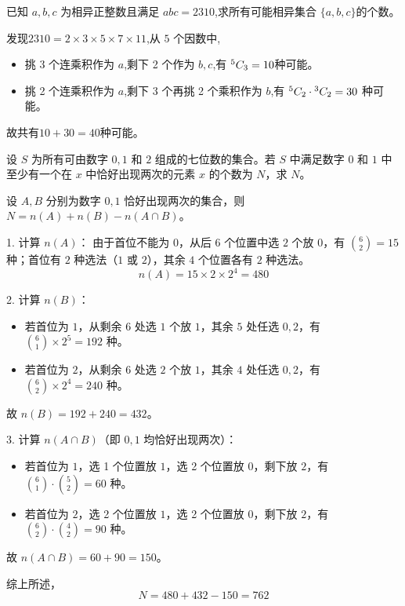 \begin{questions}
    \question 已知 $a,b,c$ 为相异正整数且满足 $abc=2310$,求所有可能相异集合 $\{a,b,c\}$的个数。
    \begin{solution}
        发现$2310 = 2\times 3\times 5\times 7\times 11$,从 $5$ 个因数中,
        \begin{itemize}
            \item 挑 3 个连乘积作为 $a$,剩下 2 个作为 $b,c$,有
            ${}^{5}C_{3} = 10$种可能。
            \item 挑 2 个连乘积作为 $a$,剩下 3 个再挑 2 个乘积作为 $b$,有 ${}^{5}C_{2} \cdot {}^{3}C_{2} = 30$
            种可能。
        \end{itemize}
        故共有$10 + 30 = 40$种可能。
    \end{solution}

\question 设 $S$ 为所有可由数字 $0, 1$ 和 $2$ 组成的七位数的集合。若 $S$ 中满足数字 $0$ 和 $1$ 中至少有一个在 $x$ 中恰好出现两次的元素 $x$ 的个数为 $N$，求 $N$。
\begin{solution}
    设 $A, B$ 分别为数字 $0, 1$ 恰好出现两次的集合，则 $N = n(A) + n(B) - n(A \cap B)$。

    1. 计算 $n(A)$：
    由于首位不能为 $0$，从后 $6$ 个位置中选 $2$ 个放 $0$，有 $\binom{6}{2}=15$ 种；首位有 $2$ 种选法（$1$ 或 $2$），其余 $4$ 个位置各有 $2$ 种选法。
    \[ n(A) = 15 \times 2 \times 2^4 = 480 \]

    2. 计算 $n(B)$：
    \begin{itemize}
        \item 若首位为 $1$，从剩余 $6$ 处选 $1$ 个放 $1$，其余 $5$ 处任选 $0, 2$，有 $\binom{6}{1} \times 2^5 = 192$ 种。
        \item 若首位为 $2$，从剩余 $6$ 处选 $2$ 个放 $1$，其余 $4$ 处任选 $0, 2$，有 $\binom{6}{2} \times 2^4 = 240$ 种。
    \end{itemize}
    故 $n(B) = 192 + 240 = 432$。

    3. 计算 $n(A \cap B)$（即 $0, 1$ 均恰好出现两次）：
    \begin{itemize}
        \item 若首位为 $1$，选 1 个位置放 $1$，选 2 个位置放 $0$，剩下放 $2$，有 $\binom{6}{1} \cdot \binom{5}{2} = 60$ 种。
        \item 若首位为 $2$，选 2 个位置放 $1$，选 2 个位置放 $0$，剩下放 $2$，有 $\binom{6}{2} \cdot \binom{4}{2} = 90$ 种。
    \end{itemize}
    故 $n(A \cap B) = 60 + 90 = 150$。

    综上所述，
    \[
    N = 480 + 432 - 150 = 762
    \]
\end{solution}


\end{questions}
